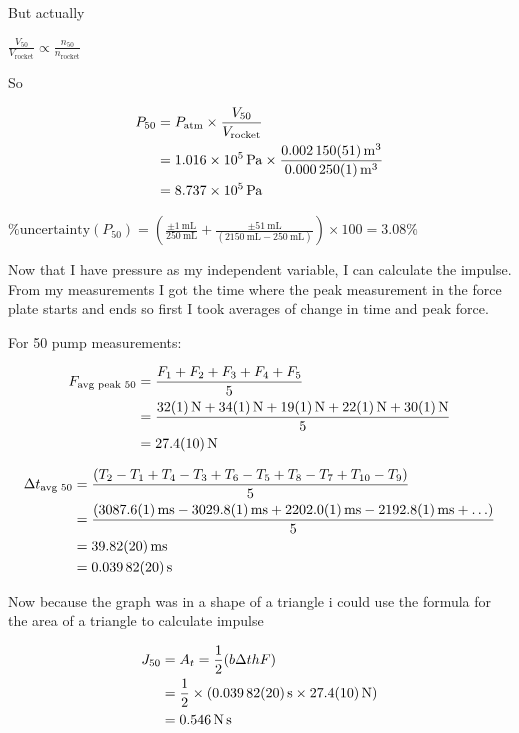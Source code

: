\documentclass[12pt,a4paper]{article}
\begin{document}
But actually

$\frac{V_{50}}{V_{\text{rocket}}} \propto \frac{n_{50}}{n_{\text{rocket}}}$

So

\begin{align}
P_{50} &= P_{\text{atm}} \times \frac{V_{50}}{V_{\text{rocket}}} \\
&= \SI{1.016e5}{\pascal} \times \frac{\SI{0.002150 \pm 0.000051}{\meter\cubed}}{\SI{0.000250 \pm 0.000001}{\meter\cubed}} \\
&= \SI{8.737e5}{\pascal}
\end{align}

$\%\text{uncertainty}(P_{50}) = \left(\frac{\pm \SI{1}{\milli\liter}}{\SI{250}{\milli\liter}} + \frac{\pm \SI{51}{\milli\liter}}{(\SI{2150}{\milli\liter} - \SI{250}{\milli\liter})}\right) \times 100 = 3.08\%$

Now that I have pressure as my independent variable, I can calculate the impulse. From my measurements I got the time where the peak measurement in the force plate starts and ends so first I took averages of change in time and peak force.

For 50 pump measurements:

\begin{align}
F_{\text{avg peak 50}} &= \frac{F_1 + F_2 + F_3 + F_4 + F_5}{5} \\
&= \frac{\SI{32 \pm 1}{\newton} + \SI{34 \pm 1}{\newton} + \SI{19 \pm 1}{\newton} + \SI{22 \pm 1}{\newton} + \SI{30 \pm 1}{\newton}}{5} \\
&= \SI{27.4 \pm 1}{\newton}
\end{align}

\begin{align}
\Delta t_{\text{avg 50}} &= \frac{(T_2 - T_1 + T_4 - T_3 + T_6 - T_5 + T_8 - T_7 + T_{10} - T_9)}{5} \\
&= \frac{(\SI{3087.6 \pm 0.1}{\milli\second} - \SI{3029.8 \pm 0.1}{\milli\second} + \SI{2202.0 \pm 0.1}{\milli\second} - \SI{2192.8 \pm 0.1}{\milli\second} + \ldots)}{5} \\
&= \SI{39.82 \pm 0.2}{\milli\second} \\
&= \SI{0.03982 \pm 0.0002}{\second}
\end{align}

Now because the graph was in a shape of a triangle i could use the formula for the area of a triangle to calculate impulse

\begin{align}
J_{50} &= A_t = \frac{1}{2}(b\Delta t h F) \\
&= \frac{1}{2} \times (\SI{0.03982 \pm 0.0002}{\second} \times \SI{27.4 \pm 1}{\newton}) \\
&= \SI{0.546}{\newton\second}
\end{align}
\end{document}
